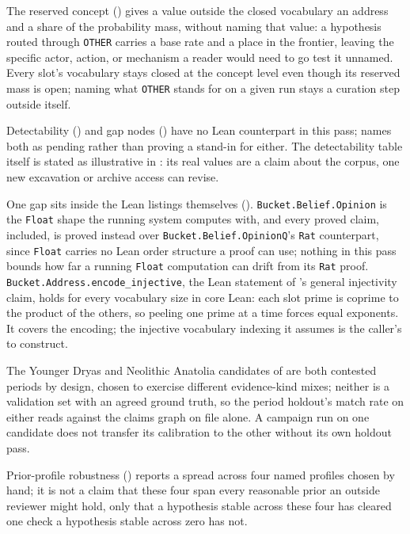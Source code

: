 \documentclass[11pt]{article}
\begin{document}
The reserved  concept
() gives a value outside the closed vocabulary an
address and a share of the probability mass, without naming that value:
a hypothesis routed through \texttt{OTHER} carries a base rate and a
place in the frontier, leaving the specific actor, action, or mechanism
a reader would need to go test it unnamed. Every slot's vocabulary stays
closed at the concept level even though its reserved mass is open;
naming what \texttt{OTHER} stands for on a given run stays a curation
step outside  itself.

Detectability () and gap nodes () have no
Lean counterpart in this pass;  names both as pending
rather than proving a stand-in for either. The detectability table itself
is stated as illustrative in : its real values
are a claim about the corpus, one new excavation or archive access can
revise.

One gap sits inside the Lean listings themselves ().
\texttt{Bucket.Belief.Opinion} is the \texttt{Float} shape the
running system computes with, and every proved claim, 
included, is proved instead over \texttt{Bucket.Belief.OpinionQ}'s
\texttt{Rat} counterpart, since \texttt{Float} carries no Lean order
structure a proof can use; nothing in this pass bounds how far a running
\texttt{Float} computation can drift from its \texttt{Rat} proof.
\texttt{Bucket.Address.encode\_injective}, the Lean statement of
's general injectivity claim, holds for every
vocabulary size in core Lean: each slot prime is coprime to the product of
the others, so peeling one prime at a time forces equal exponents. It
covers the encoding; the injective vocabulary indexing it assumes is the
caller's to construct.

The Younger Dryas and Neolithic Anatolia candidates of
 are both contested periods by design, chosen to
exercise different evidence-kind mixes; neither is a validation set with
an agreed ground truth, so the period holdout's match rate on either
reads against the claims graph on file alone. A campaign run on one
candidate does not transfer its calibration to the other without its own
holdout pass.

Prior-profile robustness () reports a spread across
four named profiles chosen by hand; it is not a claim that these four
span every reasonable prior an outside reviewer might hold, only that a
hypothesis stable across these four has cleared one check a hypothesis
stable across zero has not.
\end{document}
